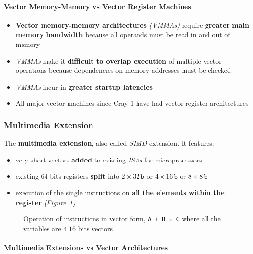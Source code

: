 \documentclass[english]{article}
\begin{document}
\paragraph{Vector Memory-Memory vs Vector Register Machines}

\begin{itemize}
  \item \textbf{Vector memory-memory architectures} \textit{(VMMAs)} require \textbf{greater main memory bandwidth} because all operands must be read in and out of memory
  \item \textit{VMMAs} make it \textbf{difficult to overlap execution} of multiple vector operations because dependencies on memory addresses must be checked
  \item \textit{VMMAs} incur in \textbf{greater startup latencies}
  \item All major vector machines since Cray-1 have had vector register architectures
\end{itemize}

\subsubsection{Multimedia Extension}

The \textbf{multimedia extension}, also called \textit{SIMD} extension. It features:

\begin{itemize}
  \item very short vectors \textbf{added} to existing \textit{ISAs} for microprocessors
  \item existing \(64\) bits registers \textbf{split} into \(2 \times 32 \, \texttt{b}\) or \(4 \times 16 \, \texttt{b}\) or \(8 \times 8 \, \texttt{b}\)
  \item execution of the single instructions on \textbf{all the elements within the register} \textit{(Figure~\ref{fig:operations-in-vector-form})}
\end{itemize}

\begin{figure}[htbp]
  \bigskip
  \centering
  \caption{Operation of instructions in vector form, \texttt{A + B = C} where all the variables are \(4\) \(16\) bits vectors}
  \label{fig:operations-in-vector-form}
  \bigskip
\end{figure}

\paragraph{Multimedia Extensions vs Vector Architectures}
\end{document}
